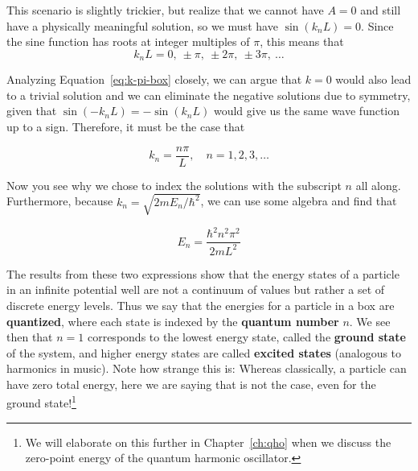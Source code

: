 This scenario is slightly trickier, but realize that we cannot have $A=0$ and still have a physically meaningful solution, so we must have $\sin(k_nL) = 0$. Since the sine function has roots at integer multiples of $\pi$, this means that
\begin{equation}
	k_nL = 0,\ \pm\pi,\ \pm2\pi,\ \pm3\pi,\ \dots \label{eq:k-pi-box}
\end{equation}

Analyzing Equation~\ref{eq:k-pi-box} closely, we can argue that $k=0$ would also lead to a trivial solution and we can eliminate the negative solutions due to symmetry, given that $\sin(-k_nL) = -\sin(k_nL)$ would give us the same wave function up to a sign. Therefore, it must be the case that 
\begin{tcolorbox}[title=Allowed values of $k$] \vspace{-2ex}
	\begin{equation}
		k_n = \frac{n\pi}{L}, \quad n = 1, 2, 3, \dots   \label{eq:k-box}
	\end{equation}
\end{tcolorbox}

Now you see why we chose to index the solutions with the subscript $n$ all along. Furthermore, because $k_n = \sqrt{2mE_n/\hbar^2}$, we can use some algebra and find that 
\begin{tcolorbox}[title = Allowed energies] \vspace{-2ex}
	\begin{equation}
		E_n = \frac{\hbar^2n^2\pi^2}{2mL^2} \label{eq:E-box}
	\end{equation}
\end{tcolorbox}

The results from these two expressions show that the energy states of a particle in an infinite potential well are not a continuum of values but rather a set of discrete energy levels. Thus we say that the energies for a particle in a box are \textbf{quantized}, where each state is indexed by the \textbf{quantum number} $n$. We see then that $n=1$ corresponds to the lowest energy state, called the \textbf{ground state} of the system, and higher energy states are called \textbf{excited states} (analogous to harmonics in music). Note how strange this is: Whereas classically, a particle can have zero total energy, here we are saying that is not the case, even for the ground state!\footnote{We will elaborate on this further in Chapter~\ref{ch:qho} when we discuss the zero-point energy of the quantum harmonic oscillator.} 

